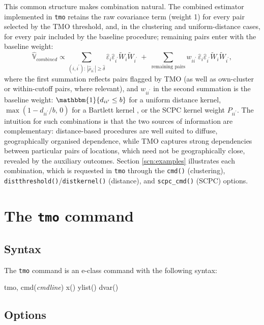 \documentclass[varwidth,bib]{statapress}
\begin{document}
This common structure makes combination natural.  The combined estimator implemented in {\tt tmo} retains the raw covariance term (weight 1) for every pair selected by the TMO threshold, and, in the clustering and uniform-distance cases, for every pair included by the baseline procedure; remaining pairs enter with the baseline weight:
\begin{equation}
\label{eqn:combined}
\widehat{\mathbb{V}}_{combined} \propto \sum_{(i,i^\prime):\, |\widehat\rho_{ii^\prime}|\geq\widehat\delta} \widehat\varepsilon_i\widehat\varepsilon_{i^\prime}\tilde{W}_i\tilde{W}_{i^\prime} \;+\; \sum_{\text{remaining pairs}} w_{ii^\prime}\, \widehat\varepsilon_i\widehat\varepsilon_{i^\prime}\tilde{W}_i\tilde{W}_{i^\prime},
\end{equation}
where the first summation reflects pairs flagged by TMO (as well as own-cluster or within-cutoff pairs, where relevant), and $w_{ii^\prime}$ in the second summation is the baseline weight: $\mathbbm{1}\{d_{ii^\prime}\leq b\}$ for a uniform distance kernel, $\max(1-d_{ii^\prime}/b,\,0)$ for a Bartlett kernel \citep[the spatial analogue of][]{neweywest87}, or the SCPC kernel weight $P_{ii^\prime}$.  The intuition for such combinations is that the two sources of information are complementary: distance-based procedures are well suited to diffuse, geographically organised dependence, while TMO captures strong dependencies between particular pairs of locations, which need not be geographically close, revealed by the auxiliary outcomes.  Section \ref{scn:examples} illustrates each combination, which is requested in {\tt tmo} through the {\tt cmd()} (clustering), {\tt distthreshold()}/{\tt distkernel()} (distance), and {\tt scpc\_cmd()} (SCPC) options.

 \clearpage
\section{The {\tt tmo} command}
\label{scn:command}
\subsection{Syntax}
The {\tt tmo} command is an e-class command with the following syntax:
\begin{stsyntax}
\/
tmo, cmd({\it cmdline\/}) 
x() ylist() dvar() 
\end{stsyntax}
\subsection{Options}
\end{document}
